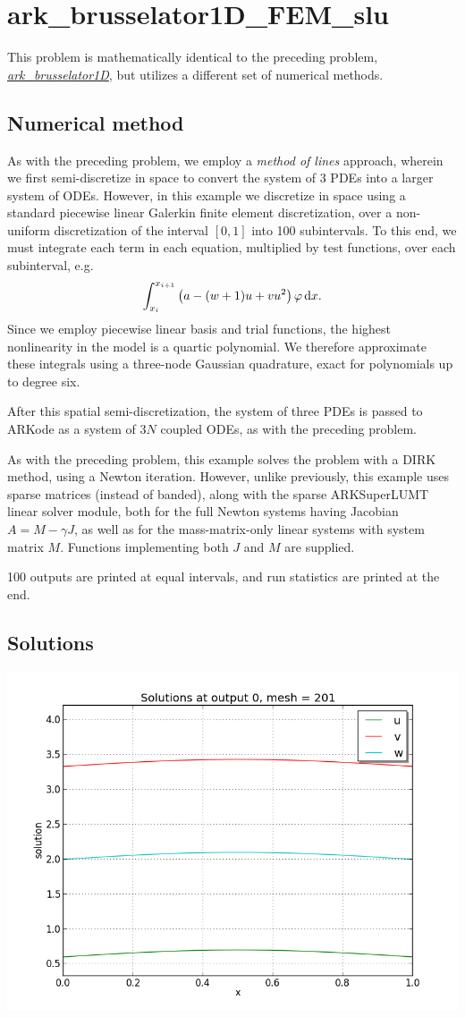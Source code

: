 \documentclass[letterpaper,10pt,english]{sphinxmanual}
\begin{document}
\section{ark\_brusselator1D\_FEM\_slu}
\label{c_serial:id20}\label{c_serial:ark-brusselator1d-fem-slu}
This problem is mathematically identical to the preceding problem,
{\hyperref[c_serial:ark-brusselator1d]{\emph{ark\_brusselator1D}}}, but utilizes a different set of numerical
methods.


\subsection{Numerical method}
\label{c_serial:id21}
As with the preceding problem, we employ a \emph{method of lines} approach,
wherein we first semi-discretize in space to convert the system of 3
PDEs into a larger system of ODEs.  However, in this example we
discretize in space using a standard piecewise linear Galerkin finite
element discretization, over a non-uniform discretization of the
interval $[0,1]$ into 100 subintervals.  To this end, we must
integrate each term in each equation, multiplied by test functions,
over each subinterval, e.g.
\begin{gather}
\begin{split}\int_{x_i}^{x_{i+1}} \left(a - (w+1) u + v u^2\right) \varphi\,\mathrm dx.\end{split}\notag
\end{gather}
Since we employ piecewise linear basis and trial functions, the
highest nonlinearity in the model is a quartic polynomial.  We
therefore approximate these integrals using a three-node Gaussian
quadrature, exact for polynomials up to degree six.

After this spatial semi-discretization, the system of three PDEs is
passed to ARKode as a system of $3N$ coupled ODEs, as with the
preceding problem.

As with the preceding problem, this example solves the problem with a
DIRK method, using a Newton iteration.  However, unlike previously,
this example uses sparse matrices (instead of banded), along with the
sparse ARKSuperLUMT linear solver module, both for the full Newton
systems having Jacobian $A=M-\gamma J$, as well as for the
mass-matrix-only linear systems with system matrix $M$.
Functions implementing both $J$ and $M$ are supplied.

100 outputs are printed at equal intervals, and run statistics
are printed at the end.


\subsection{Solutions}
\label{c_serial:id22}
\includegraphics[width=0.300\linewidth]{plot-ark_brusselator1D_FEM_1.png}
\end{document}

